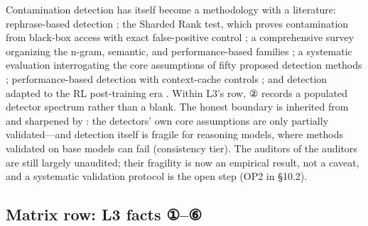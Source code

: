 \documentclass[11pt,a4paper]{article}
\begin{document}
Contamination detection has itself become a methodology with a literature: rephrase-based detection \cite{key36}; the Sharded Rank test, which proves contamination from black-box access with exact false-positive control \cite{key37}; a comprehensive survey organizing the n-gram, semantic, and performance-based families \cite{key38}; a systematic evaluation interrogating the core assumptions of fifty proposed detection methods \cite{key39}; performance-based detection with context-cache controls \cite{key40}; and detection adapted to the RL post-training era \cite{key41}. Within L3's row, ② records a populated detector spectrum rather than a blank. The honest boundary is inherited from \cite{key39} and sharpened by \cite{key42}: the detectors' own core assumptions are only partially validated—and detection itself is fragile for reasoning models, where methods validated on base models can fail \cite{key42} (consistency tier). The auditors of the auditors are still largely unaudited; their fragility is now an empirical result, not a caveat, and a systematic validation protocol is the open step (OP2 in §10.2).

\subsection{Matrix row: L3 facts ①–⑥}
\end{document}
